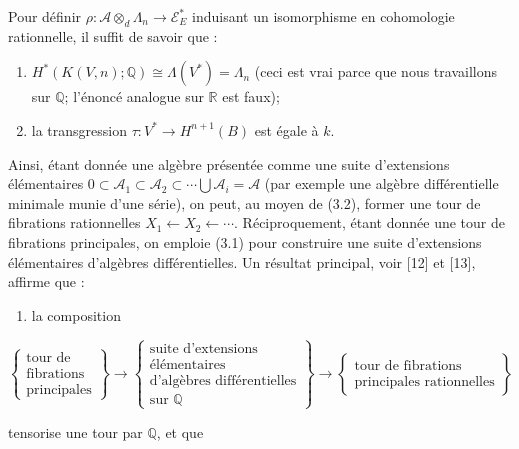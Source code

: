 \documentclass[
  french,
  a3paper,
  a3paper]{extarticle}
\providecommand{\tightlist}{%
  \setlength{\itemsep}{0pt}\setlength{\parskip}{0pt}}
\begin{document}
Pour définir
\(\rho:\mathcal A\otimes_d\Lambda_n\longrightarrow\mathcal E_E^*\)
induisant un isomorphisme en cohomologie rationnelle, il suffit de
savoir que :

\begin{enumerate}
\def\labelenumi{\arabic{enumi})}
\item
  \(H^*(K(V,n);\mathbb Q)\cong\Lambda(V^*)=\Lambda_n\) (ceci est vrai
  parce que nous travaillons sur \(\mathbb Q\); l'énoncé analogue sur
  \(\mathbb R\) est faux);
\item
  la transgression \(\tau:V^*\longrightarrow H^{n+1}(B)\) est égale à
  \(k\).
\end{enumerate}

Ainsi, étant donnée une algèbre présentée comme une suite d'extensions
élémentaires
\(0\subset\mathcal A_1\subset\mathcal A_2\subset\cdots\bigcup\mathcal A_i=\mathcal A\)
(par exemple une algèbre différentielle minimale munie d'une série), on
peut, au moyen de (3.2), former une tour de fibrations rationnelles
\(X_1\longleftarrow X_2\longleftarrow\cdots\). Réciproquement, étant
donnée une tour de fibrations principales, on emploie (3.1) pour
construire une suite d'extensions élémentaires d'algèbres
différentielles. Un résultat principal, voir {[}12{]} et {[}13{]},
affirme que :

\begin{enumerate}
\def\labelenumi{\arabic{enumi})}
\tightlist
\item
  la composition
\end{enumerate}

\[\left\{\begin{array}{c}\text{tour de}\\\text{fibrations}\\\text{principales}\end{array}\right\}\longrightarrow\left\{\begin{array}{c}\text{suite d'extensions}\\\text{élémentaires}\\\text{d'algèbres différentielles}\\\text{sur }\mathbb Q\end{array}\right\}\longrightarrow\left\{\begin{array}{c}\text{tour de fibrations}\\\text{principales rationnelles}\end{array}\right\}\]

tensorise une tour par \(\mathbb Q\), et que

\clearpage
\end{document}
